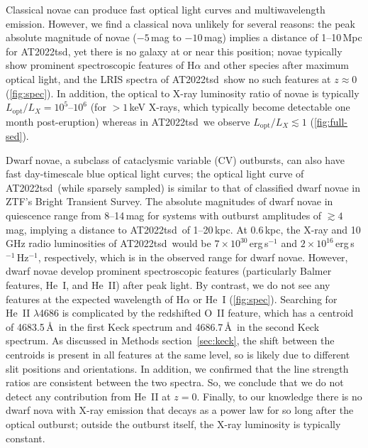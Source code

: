 \documentclass{nature_plusfigure}
\newcommand{\at}{AT2022tsd}
\begin{document}
\begin{methods}
Classical novae can produce fast optical light curves and multiwavelength emission\cite{Chomiuk2021}. However, we find a classical nova unlikely for several reasons: the peak absolute magnitude of novae ($-5\,$mag to $-10\,$mag\cite{Chomiuk2021}) implies a distance of 1--10\,Mpc for \at, yet there is no galaxy at or near this position; novae typically show prominent spectroscopic features of H$\alpha$ and other species after maximum optical light\cite{Chomiuk2021}, and the LRIS spectra of \at\ show no such features at $z\approx0$ (\ref{fig:spec}). In addition, the optical to X-ray luminosity ratio of novae is typically $L_\mathrm{opt}/L_X=10^{5}$--$10^{6}$ (for $>1\,$keV X-rays, which typically become detectable one month post-eruption\cite{Chomiuk2021}) whereas in \at\ we observe $L_\mathrm{opt}/L_X\lesssim1$ (\ref{fig:full-sed}).

Dwarf novae, a subclass of cataclysmic variable (CV) outbursts, can also have fast day-timescale blue optical light curves; the optical light curve of \at\ (while sparsely sampled) is similar to that of classified dwarf novae in ZTF's Bright Transient Survey\cite{PerleyBTS}. The absolute magnitudes of dwarf novae in quiescence range from 8--14\,mag for systems with outburst amplitudes of $\gtrsim4\,$mag\cite{Szkody2021}, implying a distance to \at\ of 1--20\,kpc. At 0.6\,kpc, the X-ray and 10\,GHz radio luminosities of \at\ would be $7\times10^{30}\,$erg\,s$^{-1}$ and $2\times10^{16}$\,erg\,s$^{-1}$\,Hz$^{-1}$, respectively, which is in the observed range for dwarf novae\cite{Polzin2022,Coppejans2020_CV}. 
However, dwarf novae develop prominent spectroscopic features (particularly Balmer features, He~I, and He~II) after peak light\cite{Morales-Rueda2002,Han2020}. By contrast, we do not see any features at the expected wavelength of H$\alpha$ or He~I (\ref{fig:spec}). Searching for He~II $\lambda$4686 is complicated by the redshifted O~II feature, which has a centroid of 4683.5\,\AA\ in the first Keck spectrum and 4686.7\,\AA\ in the second Keck spectrum. 
As discussed in Methods section~\ref{sec:keck}, the shift between the centroids is present in all features at the same level, so is likely due to different slit positions and orientations. In addition, we confirmed that the line strength ratios are consistent between the two spectra. So, we conclude that we do not detect any contribution from He~II at $z=0$.
Finally, to our knowledge there is no dwarf nova with X-ray emission that decays as a power law for so long after the optical outburst; outside the outburst itself, the X-ray luminosity is typically constant\cite{Fertig2011}.


\end{methods}
\end{document}
